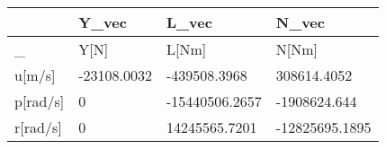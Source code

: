 \begin{tabular}{llll}
& Y_vec & L_vec & N_vec \\ 
\hline 
_ & Y[N] & L[Nm] & N[Nm] \\ 
u[m/s] & -23108.0032 & -439508.3968 & 308614.4052 \\ 
p[rad/s] & 0 & -15440506.2657 & -1908624.644 \\ 
r[rad/s] & 0 & 14245565.7201 & -12825695.1895 \\ 
\hline 
\end{tabular}